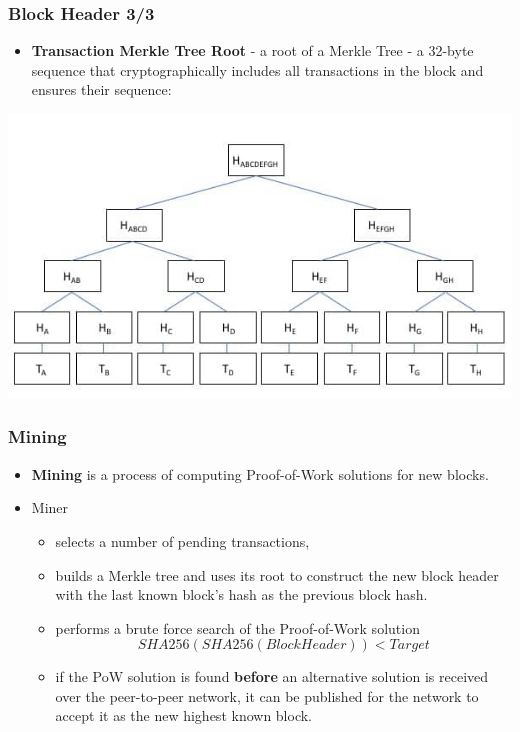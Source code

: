 \documentclass{beamer}
\begin{document}
\begin{frame}
  \frametitle{Block Header 3/3}
  \begin{itemize}
  \item \textbf{Transaction Merkle Tree Root} - a root of a Merkle Tree - a
    32-byte sequence that cryptographically includes all transactions in the
    block and ensures their sequence:
  \end{itemize}
  \includegraphics[width=\textwidth]{merkletree}
\end{frame}

\begin{frame}
  \frametitle{Mining}
  \begin{itemize}
  \item \textbf{Mining} is a process of computing Proof-of-Work solutions for
    new blocks.
  \item Miner
    \begin{itemize}
    \item selects a number of pending transactions,
    \item builds a Merkle tree and uses its root to construct the new block
      header with the last known block's hash as the previous block hash.
    \item performs a brute force search of the Proof-of-Work solution
      $$SHA256(SHA256(BlockHeader)) < Target$$
    \item if the PoW solution is found \textbf{before} an alternative solution
      is received over the peer-to-peer network, it can be published for the
      network to accept it as the new highest known block.
    \end{itemize}
  \end{itemize}
\end{frame}
\end{document}
